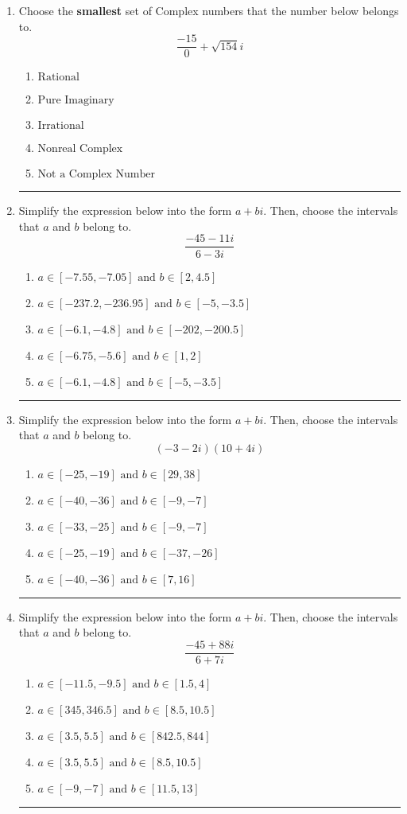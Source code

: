 \documentclass[14pt]{extbook}
\newcommand{\litem}[1]{\item#1\hspace*{-1cm}\rule{\textwidth}{0.4pt}}
\begin{document}
\begin{enumerate}
\litem{
Choose the \textbf{smallest} set of Complex numbers that the number below belongs to.\[ \frac{-15}{0}+\sqrt{154} i \]\begin{enumerate}[label=\Alph*.]
\item \( \text{Rational} \)
\item \( \text{Pure Imaginary} \)
\item \( \text{Irrational} \)
\item \( \text{Nonreal Complex} \)
\item \( \text{Not a Complex Number} \)

\end{enumerate} }
\litem{
Simplify the expression below into the form $a+bi$. Then, choose the intervals that $a$ and $b$ belong to.\[ \frac{-45 - 11 i}{6 - 3 i} \]\begin{enumerate}[label=\Alph*.]
\item \( a \in [-7.55, -7.05] \text{ and } b \in [2, 4.5] \)
\item \( a \in [-237.2, -236.95] \text{ and } b \in [-5, -3.5] \)
\item \( a \in [-6.1, -4.8] \text{ and } b \in [-202, -200.5] \)
\item \( a \in [-6.75, -5.6] \text{ and } b \in [1, 2] \)
\item \( a \in [-6.1, -4.8] \text{ and } b \in [-5, -3.5] \)

\end{enumerate} }
\litem{
Simplify the expression below into the form $a+bi$. Then, choose the intervals that $a$ and $b$ belong to.\[ (-3 - 2 i)(10 + 4 i) \]\begin{enumerate}[label=\Alph*.]
\item \( a \in [-25, -19] \text{ and } b \in [29, 38] \)
\item \( a \in [-40, -36] \text{ and } b \in [-9, -7] \)
\item \( a \in [-33, -25] \text{ and } b \in [-9, -7] \)
\item \( a \in [-25, -19] \text{ and } b \in [-37, -26] \)
\item \( a \in [-40, -36] \text{ and } b \in [7, 16] \)

\end{enumerate} }
\litem{
Simplify the expression below into the form $a+bi$. Then, choose the intervals that $a$ and $b$ belong to.\[ \frac{-45 + 88 i}{6 + 7 i} \]\begin{enumerate}[label=\Alph*.]
\item \( a \in [-11.5, -9.5] \text{ and } b \in [1.5, 4] \)
\item \( a \in [345, 346.5] \text{ and } b \in [8.5, 10.5] \)
\item \( a \in [3.5, 5.5] \text{ and } b \in [842.5, 844] \)
\item \( a \in [3.5, 5.5] \text{ and } b \in [8.5, 10.5] \)
\item \( a \in [-9, -7] \text{ and } b \in [11.5, 13] \)


\end{enumerate}}
\end{enumerate}
\end{document}
